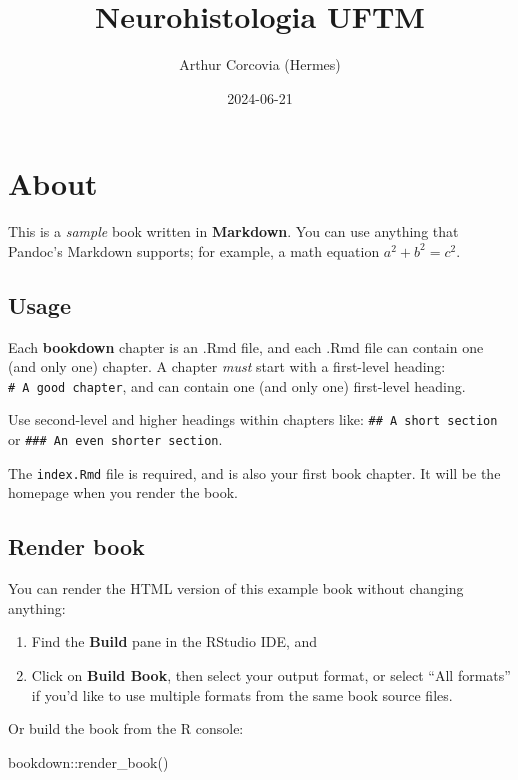\documentclass[
]{book}
\title{Neurohistologia UFTM}
\author{Arthur Corcovia (Hermes)}
\date{2024-06-21}
\newenvironment{Shaded}{\begin{snugshade}}{\end{snugshade}}
\newcommand{\FunctionTok}[1]{\textcolor[rgb]{0.00,0.00,0.00}{#1}}
\newcommand{\NormalTok}[1]{#1}
\newcommand{\SpecialCharTok}[1]{\textcolor[rgb]{0.00,0.00,0.00}{#1}}
\theoremstyle{definition}
\theoremstyle{definition}
\theoremstyle{definition}
\theoremstyle{definition}
\theoremstyle{remark}
\begin{document}
\maketitle

{
\setcounter{tocdepth}{1}
\tableofcontents
}
\hypertarget{about}{%
\chapter{About}\label{about}}

This is a \emph{sample} book written in \textbf{Markdown}. You can use anything that Pandoc's Markdown supports; for example, a math equation \(a^2 + b^2 = c^2\).

\hypertarget{usage}{%
\section{Usage}\label{usage}}

Each \textbf{bookdown} chapter is an .Rmd file, and each .Rmd file can contain one (and only one) chapter. A chapter \emph{must} start with a first-level heading: \texttt{\#\ A\ good\ chapter}, and can contain one (and only one) first-level heading.

Use second-level and higher headings within chapters like: \texttt{\#\#\ A\ short\ section} or \texttt{\#\#\#\ An\ even\ shorter\ section}.

The \texttt{index.Rmd} file is required, and is also your first book chapter. It will be the homepage when you render the book.

\hypertarget{render-book}{%
\section{Render book}\label{render-book}}

You can render the HTML version of this example book without changing anything:

\begin{enumerate}
\def\labelenumi{\arabic{enumi}.}
\item
  Find the \textbf{Build} pane in the RStudio IDE, and
\item
  Click on \textbf{Build Book}, then select your output format, or select ``All formats'' if you'd like to use multiple formats from the same book source files.
\end{enumerate}

Or build the book from the R console:

\begin{Shaded}
\begin{Highlighting}[]
\NormalTok{bookdown}\SpecialCharTok{::}\FunctionTok{render\_book}\NormalTok{()}
\end{Highlighting}
\end{Shaded}
\end{document}

